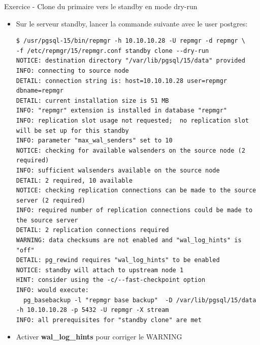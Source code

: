 
\begin{frame}[fragile]{Exercice - Clone du primaire vers le standby en mode dry-run}

   \begin{itemize}
      \item Sur le serveur standby, lancer la commande suivante avec le user postgres:
\begin{tiny}
\begin{Verbatim}[commandchars=\&\{\}]
$ /usr/pgsql-15/bin/repmgr -h 10.10.10.28 -U repmgr -d repmgr \
-f /etc/repmgr/15/repmgr.conf standby clone --dry-run
NOTICE: destination directory "/var/lib/pgsql/15/data" provided
INFO: connecting to source node
DETAIL: connection string is: host=10.10.10.28 user=repmgr dbname=repmgr
DETAIL: current installation size is 51 MB
INFO: "repmgr" extension is installed in database "repmgr"
INFO: replication slot usage not requested;  no replication slot will be set up for this standby
INFO: parameter "max_wal_senders" set to 10
NOTICE: checking for available walsenders on the source node (2 required)
INFO: sufficient walsenders available on the source node
DETAIL: 2 required, 10 available
NOTICE: checking replication connections can be made to the source server (2 required)
INFO: required number of replication connections could be made to the source server
DETAIL: 2 replication connections required
WARNING: data checksums are not enabled and "wal_log_hints" is "off"
DETAIL: pg_rewind requires "wal_log_hints" to be enabled
NOTICE: standby will attach to upstream node 1
HINT: consider using the -c/--fast-checkpoint option
INFO: would execute:
  pg_basebackup -l "repmgr base backup"  -D /var/lib/pgsql/15/data -h 10.10.10.28 -p 5432 -U repmgr -X stream 
INFO: all prerequisites for "standby clone" are met
\end{Verbatim}
\end{tiny}
      \item Activer \textbf{wal\_log\_hints} pour corriger le WARNING
   \end{itemize}

\end{frame}


